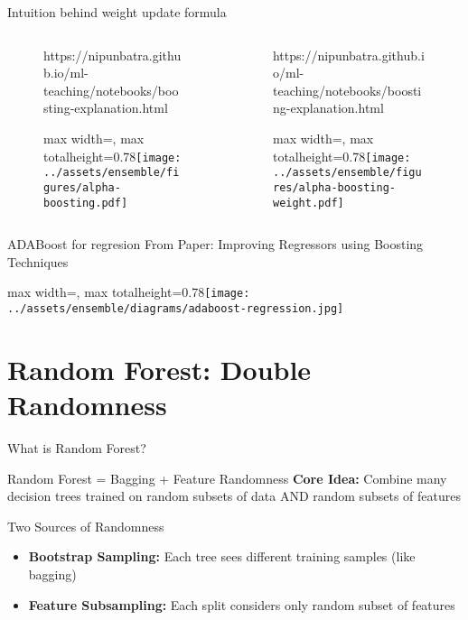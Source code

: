 \documentclass[10pt]{beamer}
\newcommand{\fitpic}[1]{\begin{adjustbox}{max width=\linewidth, max totalheight=0.78\textheight}#1\end{adjustbox}}
\begin{document}
\begin{frame}{Intuition behind weight update formula}
  \begin{columns}
    \pause \begin{column}{0.5\textwidth}

      \begin{figure}[htp]
        \centering
        \begin{notebookbox}{https://nipunbatra.github.io/ml-teaching/notebooks/boosting-explanation.html}
          \fitpic{\texttt{[image: ../assets/ensemble/figures/alpha-boosting.pdf]}}
        \end{notebookbox}
      \end{figure}
    \end{column}
    \pause \begin{column}{0.5\textwidth}
      \begin{figure}[htp]
        \centering
        \begin{notebookbox}{https://nipunbatra.github.io/ml-teaching/notebooks/boosting-explanation.html}
          \fitpic{\texttt{[image: ../assets/ensemble/figures/alpha-boosting-weight.pdf]}}
        \end{notebookbox}
      \end{figure}
    \end{column}
  \end{columns}


\end{frame}

\begin{frame}{ADABoost for regresion}
  From Paper: Improving Regressors using Boosting Techniques

  \fitpic{\texttt{[image: ../assets/ensemble/diagrams/adaboost-regression.jpg]}}
  
\end{frame}

\section{Random Forest: Double Randomness}

\begin{frame}{What is Random Forest?}
\begin{definitionbox}{Random Forest = Bagging + Feature Randomness}
\textbf{Core Idea:} Combine many decision trees trained on random subsets of data AND random subsets of features
\end{definitionbox}

\begin{keypointsbox}{Two Sources of Randomness}
\begin{itemize}
\item \textbf{Bootstrap Sampling:} Each tree sees different training samples (like bagging)
\item \textbf{Feature Subsampling:} Each split considers only random subset of features
\end{itemize}
\end{keypointsbox}
\end{frame}
\end{document}
